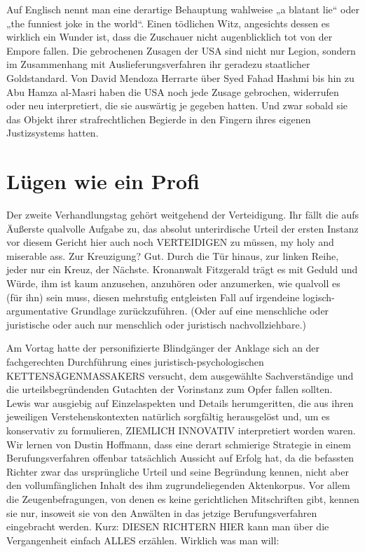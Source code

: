\begin{multicols}{2}
Auf Englisch nennt man eine derartige Behauptung
wahlweise „a blatant lie“ oder „the funniest joke in the
world“. Einen tödlichen Witz, angesichts dessen es wirklich ein Wunder ist, dass die Zuschauer nicht augenblicklich tot von der Empore fallen. Die gebrochenen
Zusagen der USA sind nicht nur Legion, sondern im Zusammenhang mit Auslieferungsverfahren ihr geradezu
staatlicher Goldstandard. Von David Mendoza Herrarte
über Syed Fahad Hashmi bis hin zu Abu Hamza al-Masri haben die USA noch jede Zusage gebrochen, widerrufen oder neu interpretiert, die sie auswärtig je gegeben
hatten. Und zwar sobald sie das Objekt ihrer strafrechtlichen Begierde in den Fingern ihres eigenen Justizsystems hatten.




\chapter{Lügen wie ein Profi} %

Der zweite Verhandlungstag gehört weitgehend der Verteidigung. Ihr fällt die aufs Äußerste qualvolle Aufgabe
zu, das absolut unterirdische Urteil der ersten Instanz
vor diesem Gericht hier auch noch VERTEIDIGEN zu
müssen, my holy and miserable ass. Zur Kreuzigung?
Gut. Durch die Tür hinaus, zur linken Reihe, jeder nur
ein Kreuz, der Nächste. Kronanwalt Fitzgerald trägt es
mit Geduld und Würde, ihm ist kaum anzusehen, anzuhören oder anzumerken, wie qualvoll es (für ihn) sein
muss, diesen mehrstufig entgleisten Fall auf irgendeine logisch-argumentative Grundlage zurückzuführen.
(Oder auf eine menschliche oder juristische oder auch nur menschlich oder juristisch nachvollziehbare.)

Am Vortag hatte der personifizierte Blindgänger der Anklage sich an der fachgerechten Durchführung eines juristisch-psychologischen KETTENSÄGENMASSAKERS
versucht, dem ausgewählte Sachverständige und die
urteilsbegründenden Gutachten der Vorinstanz zum
Opfer fallen sollten. Lewis war ausgiebig auf Einzelaspekten und Details herumgeritten, die aus ihren jeweiligen Verstehenskontexten natürlich sorgfältig herausgelöst und, um es konservativ zu formulieren, ZIEMLICH
INNOVATIV interpretiert worden waren. Wir lernen von
Dustin Hoffmann, dass eine derart schmierige Strategie
in einem Berufungsverfahren offenbar tatsächlich Aussicht auf Erfolg hat, da die befassten Richter zwar das ursprüngliche Urteil und seine Begründung kennen, nicht
aber den vollumfänglichen Inhalt des ihm zugrundeliegenden Aktenkorpus. Vor allem die Zeugenbefragungen,
von denen es keine gerichtlichen Mitschriften gibt, kennen sie nur, insoweit sie von den Anwälten in das jetzige
Berufungsverfahren eingebracht werden.
Kurz: DIESEN RICHTERN HIER kann man über die Vergangenheit einfach ALLES erzählen. Wirklich was man
will:


\end{multicols}
